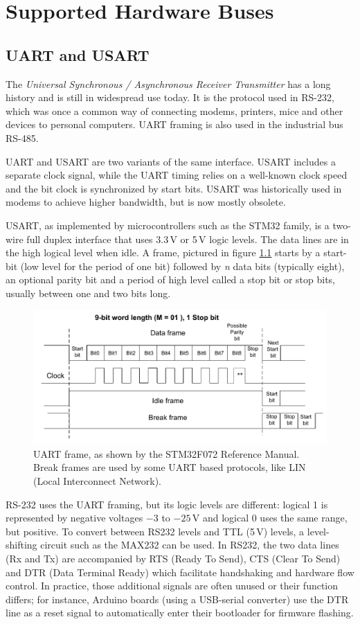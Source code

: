 \chapter{Supported Hardware Buses}

\section{UART and USART}

The \textit{Universal Synchronous / Asynchronous Receiver Transmitter} has a long history and is still in widespread use today. It is the protocol used in RS-232, which was once a common way of connecting modems, printers, mice and other devices to personal computers. UART framing is also used in the industrial bus RS-485.

UART and USART are two variants of the same interface. USART includes a separate clock signal, while the UART timing relies on a well-known clock speed and the bit clock is synchronized by start bits. USART was historically used in modems to achieve higher bandwidth, but is now mostly obsolete.

USART, as implemented by microcontrollers such as the STM32 family, is a two-wire full duplex interface that uses 3.3\,V or 5\,V logic levels. The data lines are in the high logical level when idle. A frame, pictured in figure \ref{fig:uart-frame} starts by a start-bit (low level for the period of one bit) followed by \textit{n} data bits (typically eight), an optional parity bit and a period of high level called a stop bit or stop bits, usually between one and two bits long.

\begin{figure}
	\centering
	\includegraphics[width=.8\textwidth] {img/usart.png}
	\caption{\label{fig:uart-frame}UART frame, as shown by the STM32F072 Reference Manual. Break frames are used by some UART based protocols, like LIN (Local Interconnect Network).}
\end{figure}
 
RS-232 uses the UART framing, but its logic levels are different: logical 1 is represented by negative voltages $-3$ to $-25$\,V and logical 0 uses the same range, but positive. To convert between RS232 levels and TTL (5\,V) levels, a level-shifting circuit such as the MAX232 can be used. In RS232, the two data lines (Rx and Tx) are accompanied by RTS (Ready To Send), CTS (Clear To Send) and DTR (Data Terminal Ready) which facilitate handshaking and hardware flow control. In practice, those additional signals are often unused or their function differs; for instance, Arduino boards (using a USB-serial converter) use the DTR line as a reset signal to automatically enter their bootloader for firmware flashing.

